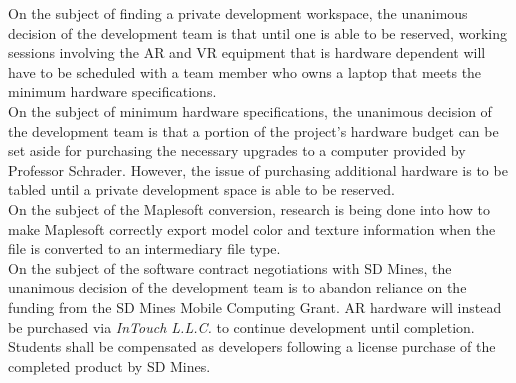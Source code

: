         On the subject of finding a private development workspace, the unanimous decision of the development team is
        that until one is able to be reserved, working sessions involving the AR and VR equipment that is hardware
        dependent will have to be scheduled with a team member who owns a laptop that meets the minimum hardware
        specifications.\\

        On the subject of minimum hardware specifications, the unanimous decision of the development team is that a 
        portion of the project's hardware budget can be set aside for purchasing the necessary upgrades to a computer
        provided by Professor Schrader.  However, the issue of purchasing additional hardware is to be tabled until a
        private development space is able to be reserved.\\

        On the subject of the Maplesoft conversion, research is being done into how to make Maplesoft correctly export
        model color and texture information when the file is converted to an intermediary file type.\\ 

        On the subject of the software contract negotiations with SD Mines, the unanimous decision of the development 
        team is to abandon reliance on the funding from the SD Mines Mobile Computing Grant.  AR hardware will instead 
        be purchased via 
        \textit{InTouch L.L.C.}
        to continue development until completion.  Students shall be compensated as developers following a
        license purchase of the completed product by SD Mines.